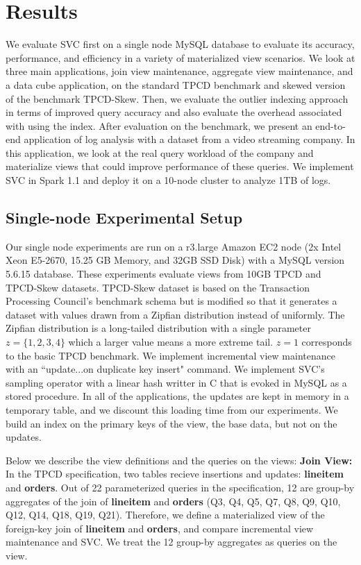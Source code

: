 \vspace{-.5em}
\section{Results}
\label{exp}
We evaluate SVC first on a single node MySQL database to evaluate its accuracy, performance, and efficiency in a variety of materialized view 
scenarios.
We look at three main applications, join view maintenance, aggregate view maintenance, and a data cube application, on the standard TPCD benchmark 
and skewed version of the benchmark TPCD-Skew.
Then, we evaluate the outlier indexing approach in terms of improved query accuracy and also evaluate the overhead associated with using the index.
After evaluation on the benchmark, we present an end-to-end application of log analysis with a dataset from a video streaming company.
In this application, we look at the real query workload of the company and materialize views that could improve performance of these queries.
We implement SVC in Spark 1.1 and deploy it on a 10-node cluster to analyze 1TB of logs.

\subsection{Single-node Experimental Setup}
Our single node experiments are run on a r3.large Amazon EC2 node (2x Intel Xeon E5-2670, 15.25 GB Memory, and 32GB SSD Disk) with a MySQL version 5.6.15 database.
These experiments evaluate views from 10GB TPCD and TPCD-Skew datasets.
TPCD-Skew dataset \cite{tpcdskew} is based on the Transaction Processing Council's benchmark
schema but is modified so that it generates a dataset with values drawn from a Zipfian distribution instead of uniformly.
The Zipfian distribution \cite{mitzenmacher2004brief} is a long-tailed distribution with a single parameter $z=\{1,2,3,4\}$ which a larger
value means a more extreme tail.
$z=1$ corresponds to the basic TPCD benchmark. 
We implement incremental view maintenance with an ``update...on duplicate key insert" command.
We implement SVC's sampling operator with a linear hash writter in C that is evoked in MySQL as a stored procedure.
In all of the applications, the updates are kept in memory in a temporary table, and we discount this loading time from our experiments.
We build an index on the primary keys of the view, the base data, but not on the updates.

Below we describe the view definitions and the queries on the views:
\textbf{Join View: } In the TPCD specification, two tables recieve insertions and updates: \textbf{lineitem} and \textbf{orders}.
Out of 22 parameterized queries in the specification, 12 are group-by aggregates of the join of \textbf{lineitem} and \textbf{orders} (Q3, Q4, Q5, Q7, Q8, Q9, Q10, Q12, Q14, Q18, Q19, Q21).
Therefore, we define a materialized view of the foreign-key join of \textbf{lineitem} and \textbf{orders}, and compare incremental view maintenance and SVC.
We treat the 12 group-by aggregates as queries on the view.

